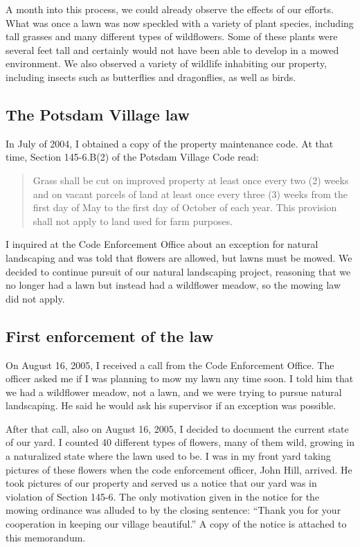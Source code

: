 \documentclass[12pt]{article}
\begin{document}
A month into this process, we could already observe the effects of our efforts.
What was once a lawn was now speckled with a variety of plant species, including tall grasses and many different types of wildflowers.
Some of these plants were several feet tall and certainly would not have been able to develop in a mowed environment.
We also observed a variety of wildlife inhabiting our property, including insects such as butterflies and dragonflies, as well as birds.

\subsection{The Potsdam Village law}

In July of 2004, I obtained a copy of the property maintenance code.
At that time, Section 145-6.B(2) of the Potsdam Village Code read:
\begin{quote}
Grass shall be cut on improved property at least once every two (2) weeks and on vacant parcels of land at least once every three (3) weeks from the first day of May to the first day of October of each year.  
This provision shall not apply to land used for farm purposes.
\end{quote}
I inquired at the Code Enforcement Office about an exception for natural landscaping and was told that flowers are allowed, but lawns must be mowed.
We decided to continue pursuit of our natural landscaping project, reasoning that we no longer had a lawn but instead had a wildflower meadow, so the mowing law did not apply.

\subsection{First enforcement of the law}

On August 16, 2005, I received a call from the Code Enforcement Office.
The officer asked me if I was planning to mow my lawn any time soon.
I told him that we had a wildflower meadow, not a lawn, and we were trying to pursue natural landscaping.
He said he would ask his supervisor if an exception was possible.

After that call, also on August 16, 2005, I decided to document the current state of our yard.
I counted 40 different types of flowers, many of them wild, growing in a naturalized state where the lawn used to be.
I was in my front yard taking pictures of these flowers when the code enforcement officer, John Hill, arrived.
He took pictures of our property and served us a notice that our yard was in violation of Section 145-6.
The only motivation given in the notice for the mowing ordinance was alluded to by the closing sentence:  ``Thank you for your cooperation in keeping our village beautiful.''
A copy of the notice is attached to this memorandum.
\end{document}
